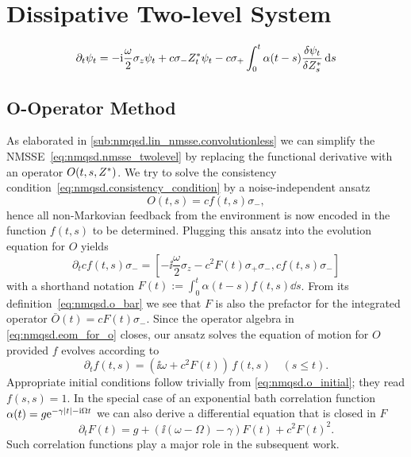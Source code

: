 \section{Dissipative Two-level System}
\label{sec:nmqsd.two_level}

\begin{equation}
  \partial_t \psi_t = -\mathrm{i}\frac{\omega}{2}\sigma_z\psi_t + c \sigma_- {Z}^*_t \psi_t - c\sigma_+ \int_0^t \alpha(t - s) \frac{\delta\psi_t}{\delta {Z}^*_s} \, \mathrm{d} s
  \label{eq:nmqsd.nmsse_twolevel}
\end{equation}

\subsection{O-Operator Method}
\label{sub:nmqsd.two_level.o}
%

As elaborated in \autoref{sub:nmqsd.lin_nmsse.convolutionless} we can simplify the NMSSE~\ref{eq:nmqsd.nmsse_twolevel} by replacing the functional derivative with an operator $O(t, s, {Z}^*)$.
We try to solve the consistency condition~\ref{eq:nmqsd.consistency_condition} by a noise-independent ansatz
\begin{equation}
  O(t, s) = c f(t, s) \sigma_-,
  \label{eq:nmqsd.o_ansatz}
\end{equation}
hence all non-Markovian feedback from the environment is now encoded in the function $f(t, s)$ to be determined.
Plugging this ansatz into the evolution equation for $O$ yields
\begin{equation}
  \partial_t c f(t, s) \sigma_- = \left[-\ii \frac{\omega}{2} \sigma_z - c^2 F(t) \sigma_+\sigma_-, c f(t, s) \sigma_-\right]
  \label{eq:nmqsd.eom_for_o}
\end{equation}
with a shorthand notation $F(t) := \int_0^t \alpha(t-s) f(t, s) \dd s$.
From its definition~\ref{eq:nmqsd.o_bar} we see that $F$ is also the prefactor for the integrated operator $\bar O(t) = c F(t) \sigma_-$.
Since the operator algebra in \autoref{eq:nmqsd.eom_for_o} closes, our ansatz solves the equation of motion for $O$ provided $f$ evolves according to
\begin{equation*}
  \partial_t f(t, s) = \left(\ii \omega + c^2 F(t)\right) \, f(t, s) \quad (s \le t).
\end{equation*}
Appropriate initial conditions follow trivially from \autoref{eq:nmqsd.o_initial}; they read $f(s, s) = 1$.
In the special case of an exponential bath correlation function $\alpha(t) = g \exp[-\gamma\abs{t} - \ii\Omega t]$ we can also derive a differential equation that is closed in $F$
\begin{equation*}
  \partial_t F(t) = g + (\ii (\omega - \Omega) - \gamma) F(t) + c^2 F(t)^2.
\end{equation*}
Such correlation functions play a major role in the subsequent work.

